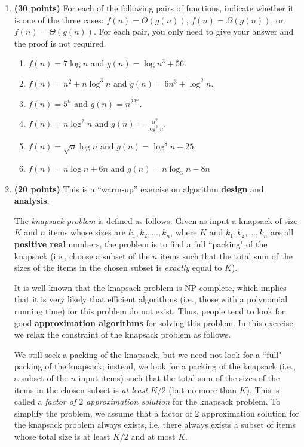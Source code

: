 \documentclass[11pt]{article}
\begin{document}
\begin{enumerate}
\item
{\bf (30 points)}
For each of the following pairs of functions, indicate
whether it is one of the three cases: $f(n)=O(g(n))$, $f(n)=\Omega(g(n))$, or $f(n)=\Theta(g(n))$. For each pair, you only need to give your answer and the proof is not required.


\begin{enumerate}
\item $f(n)=7\log n$ and $g(n)=\log n^3 + 56$.
\item $f(n)=n^2+n\log^3 n$ and $g(n)=6n^3+\log^2n$.
\item $f(n)=5^n$ and $g(n)=n^22^n$.
\item $f(n)=n\log^2n$ and $g(n)=\frac{n^2}{\log^3 n}$.
\item $f(n)=\sqrt{n}\log n$ and $g(n)=\log^8n+25$.
\item $f(n)= n\log n+6n$ and $g(n) = n\log_3 n-8n$
\end{enumerate}



\item
{\bf (20 points)}
This is a ``warm-up'' exercise on algorithm {\bf design} and {\bf analysis}.

The {\em knapsack problem} is defined as follows: Given as input a
knapsack of size $K$ and $n$ items whose sizes are
$k_1,k_2,\ldots,k_n$, where $K$ and $k_1,k_2,\ldots,k_n$ are all {\bf positive real}
numbers, the problem is to find a full ``packing" of the knapsack (i.e., choose a subset
of the $n$ items such that the total sum of the sizes of the items in
the chosen subset is {\em exactly} equal to $K$).

It is well known that the knapsack problem is NP-complete, which
implies that it is very likely that efficient algorithms (i.e., those
with a polynomial running time) for this problem do not exist. Thus,
people tend to look for good {\bf approximation algorithms} for
solving this problem. In this exercise, we relax the constraint of the
knapsack problem as follows.

We still seek a packing of the knapsack,
but we need not look for a ``full" packing of the knapsack; instead,
we look for a packing of the knapsack (i.e., a subset of the $n$ input
items) such that the total sum of the sizes of the items in the chosen
subset is {\em at least} $K/2$ (but no more than $K$).
This is called a {\em factor of $2$
approximation solution} for the knapsack problem. To simplify the
problem, we assume that a factor of $2$ approximation solution for the
knapsack problem always exists, i.e, there always exists a subset of items whose total size is at least $K/2$ and at most $K$.


\end{enumerate}
\end{document}
